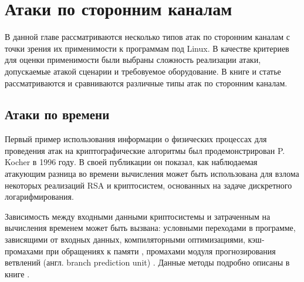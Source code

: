 \section{Атаки по сторонним каналам} \label{sec:sca}

В данной главе рассматриваются несколько типов атак по сторонним каналам с
точки зрения их применимости к программам под Linux. В качестве критериев для
оценки применимости были выбраны сложность реализации атаки, допускаемые атакой
сценарии и требовуемое оборудование. В книге \cite{cren} и статье \cite{10years}
рассматриваются и сравниваются различные типы атак по сторонним каналам.


\subsection{Атаки по времени}

Первый пример использования информации о физических процессах для проведения
атак на криптографические алгоритмы был продемонстрирован P. Kocher в 1996 году.
В своей публикации \cite{kocher} он показал, как наблюдаемая атакующим разница
во времени вычисления может быть использована для взлома некоторых реализаций
RSA и криптосистем, основанных на задаче дискретного логарифмирования.

Зависимость между входными данными криптосистемы и затраченным на вычисления
временем может быть вызвана: условными переходами в программе, зависящими от
входных данных, компиляторными оптимизациями, кэш-промахами при обращениях к
памяти \cite{bernstein}, промахами модуля прогнозирования ветвлений (англ.
branch prediction unit) \cite{bpa} \cite{sbpa}. Данные методы подробно описаны в
книге \cite{cren}.


